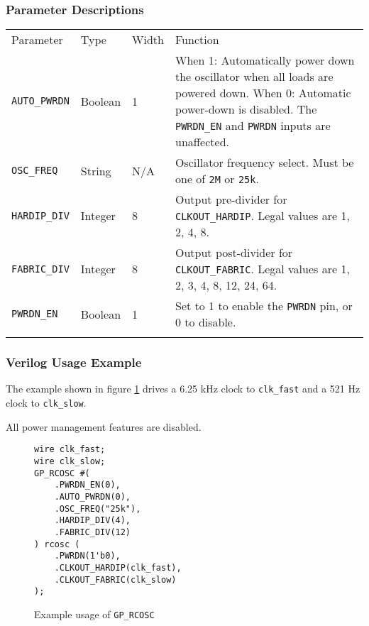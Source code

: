 \documentclass[11pt]{article}
\newcommand{\tokenstyle}[1]{\texttt{#1}}
\newcommand{\wirestyle}[1]{\texttt{#1}}
\newcommand{\valuestyle}[1]{\texttt{#1}}
\newcommand{\strvaluestyle}[1]{\valuestyle{\textquotedbl#1\textquotedbl}}
\newcommand{\whenstyle}[1]{{\fontseries{sb}\selectfont#1}}
\newcommand{\thinhline}{\Xhline{1\arrayrulewidth}}
\newcommand{\thickhline}{\Xhline{2.5\arrayrulewidth}}
\begin{document}
\subsubsection{Parameter Descriptions}

\begin{tabularx}{\textwidth}{lllX}
\thinhline
\whenstyle{Parameter} & \whenstyle{Type} & \whenstyle{Width} & \whenstyle{Function} \\
\thickhline
\tokenstyle{AUTO\_PWRDN} & Boolean & 1 &
	\whenstyle{When 1:} Automatically power down the oscillator when all loads are powered down. \newline
	\whenstyle{When 0:} Automatic power-down is disabled. The \tokenstyle{PWRDN\_EN} and \tokenstyle{PWRDN} inputs are unaffected.\\
\thinhline
\tokenstyle{OSC\_FREQ} & String & N/A & Oscillator frequency select. Must be one of \strvaluestyle{2M} or \strvaluestyle{25k}. \\
\thinhline
\tokenstyle{HARDIP\_DIV} & Integer & 8 &
	Output pre-divider for \tokenstyle{CLKOUT\_HARDIP}. Legal values are 1, 2, 4, 8. \\
\thinhline
\tokenstyle{FABRIC\_DIV} & Integer & 8 &
	Output post-divider for \tokenstyle{CLKOUT\_FABRIC}. Legal values are 1, 2, 3, 4, 8, 12, 24, 64. \\
\thinhline
\tokenstyle{PWRDN\_EN} & Boolean & 1 & Set to 1 to enable the \tokenstyle{PWRDN} pin, or 0 to disable. \\
\thinhline
\end{tabularx}

\pagebreak
\subsubsection{Verilog Usage Example}

The example shown in figure \ref{gp-rcosc-example} drives a 6.25 kHz clock to \wirestyle{clk\_fast} and a 521 Hz clock to
\wirestyle{clk\_slow}.

All power management features are disabled.

\begin{figure}[h]
\begin{lstlisting}
wire clk_fast;
wire clk_slow;
GP_RCOSC #(
	.PWRDN_EN(0),
	.AUTO_PWRDN(0),
	.OSC_FREQ("25k"),
	.HARDIP_DIV(4),
	.FABRIC_DIV(12)
) rcosc (
	.PWRDN(1'b0),
	.CLKOUT_HARDIP(clk_fast),
	.CLKOUT_FABRIC(clk_slow)
);
\end{lstlisting}
\caption{Example usage of \tokenstyle{GP\_RCOSC}}
\label{gp-rcosc-example}
\end{figure}
\end{document}
